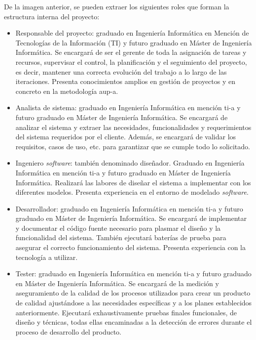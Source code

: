 \documentclass[12pt,a4paper, twoside]{report}
\begin{document}
	De la imagen anterior, se pueden extraer los siguientes roles que forman la estructura interna del proyecto:

	\begin{itemize}
		\item Responsable del proyecto: graduado en Ingeniería Informática en Mención de Tecnologías de la Información (TI) y futuro graduado en Máster de Ingeniería Informática. Se encargará de ser el gerente de toda la asignación de tareas y recursos, supervisar el control, la planificación y el seguimiento del proyecto, es decir, mantener una correcta evolución del trabajo a lo largo de las iteraciones. Presenta conocimientos amplios en gestión de proyectos y en concreto en la metodología \gls{aup-a}.
		
		\item Analista de sistema: graduado en Ingeniería Informática en mención \gls{ti-a} y futuro graduado en Máster de Ingeniería Informática. Se encargará de analizar el sistema y extraer las necesidades, funcionalidades y requerimientos del sistema requeridos por el cliente. Además, se encargará de validar los requisitos, casos de uso, etc. para garantizar que se cumple todo lo solicitado.
		
		\item Ingeniero \textit{software}: también denominado diseñador. Graduado en Ingeniería Informática en mención \gls{ti-a} y futuro graduado en Máster de Ingeniería Informática. Realizará las labores de diseñar el sistema a implementar con los diferentes modelos. Presenta experiencia en el entorno de modelado \textit{software}.
		
		\item Desarrollador: graduado en Ingeniería Informática en mención \gls{ti-a} y futuro graduado en Máster de Ingeniería Informática. Se encargará de implementar y documentar el código fuente necesario para plasmar el diseño y la funcionalidad del sistema. También ejecutará baterías de prueba para asegurar el correcto funcionamiento del sistema. Presenta experiencia con la tecnología a utilizar.
		
		\item Tester: graduado en Ingeniería Informática en mención \gls{ti-a} y futuro graduado en Máster de Ingeniería Informática. Se encargará de la medición y aseguramiento de la calidad de los procesos utilizados para crear un producto de calidad ajustándose a las necesidades específicas y a los planes establecidos anteriormente. Ejecutará exhaustivamente pruebas finales funcionales, de diseño y técnicas, todas ellas encaminadas a la detección de errores durante el proceso de desarrollo del producto.		
	\end{itemize}
		
\end{document}
